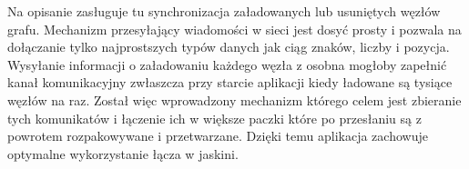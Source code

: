 Na opisanie zasługuje tu synchronizacja załadowanych lub usuniętych węzłów grafu. Mechanizm przesyłający wiadomości w sieci jest dosyć prosty i pozwala na dołączanie tylko najprostszych typów danych jak ciąg znaków, liczby i pozycja. Wysyłanie informacji o załadowaniu każdego węzła z osobna mogłoby zapełnić kanał komunikacyjny zwłaszcza przy starcie aplikacji kiedy ładowane są tysiące węzłów na raz. Został więc wprowadzony mechanizm którego celem jest zbieranie tych komunikatów i łączenie ich w większe paczki które po przesłaniu są z powrotem rozpakowywane i przetwarzane. Dzięki temu aplikacja zachowuje optymalne wykorzystanie łącza w jaskini.

